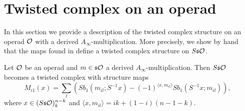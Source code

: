 \documentclass[Thesis.tex]{subfiles}
\begin{document}
\section{Twisted complex on an operad}\label{twistedoperad}
In this section we provide a description of the twisted complex structure on an operad ${\mathcal O}$ with a derived $A_\infty$-multiplication. More precisely, we show by hand that the maps found in  define a twisted complex structure on $S\mathfrak{s}{\mathcal O}$.

\begin{lem}\label{twistedmaps}
Let ${\mathcal O}$ be an operad and  $m\in\mathfrak{s}{\mathcal O}$ a derived $A_\infty$-multiplication. Then $S\mathfrak{s}{\mathcal O}$ becomes a twisted complex with structure maps
\[M_{i1}(x)= \sum_l (Sb_1(m_{il};S^{-1}x)-(-1)^{\langle x,m_{il}\rangle}Sb_1(S^{-1}x;m_{il})),\]
where $x\in (S\mathfrak{s}{\mathcal O})^{n-k}_k$ and $\langle x,m_{il}\rangle=ik+(1-i)(n-1-k)$.
\end{lem}
\end{document}
